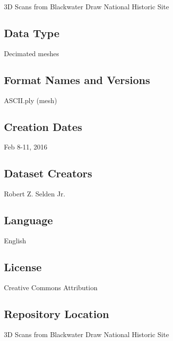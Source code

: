 \documentclass[preprint,12pt]{elsarticle}
\begin{document}
3D Scans from Blackwater Draw National Historic Site

\subsection{Data Type}

Decimated meshes

\subsection{Format Names and Versions}

ASCII.ply (mesh)

\subsection{Creation Dates}

Feb 8-11, 2016

\subsection{Dataset Creators}

Robert Z. Selden Jr.

\subsection{Language}

English

\subsection{License}

Creative Commons Attribution

\subsection{Repository Location}
3D Scans from Blackwater Draw National Historic Site
\end{document}
